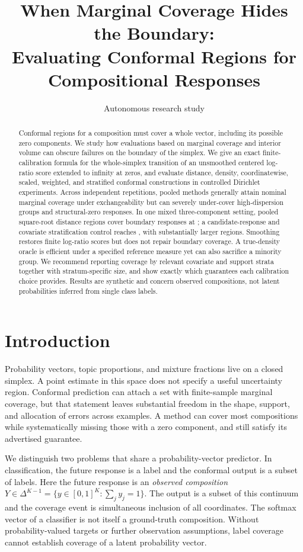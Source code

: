 \documentclass{article}
\title{When Marginal Coverage Hides the Boundary:\\Evaluating Conformal Regions for Compositional Responses}
\author{Autonomous research study}
\newcommand{\D}{\Delta^{K-1}}
\begin{document}
\maketitle

\begin{abstract}
Conformal regions for a composition must cover a whole vector, including its possible zero components. We study how evaluations based on marginal coverage and interior volume can obscure failures on the boundary of the simplex. We give an exact finite-calibration formula for the whole-simplex transition of an unsmoothed centered log-ratio score extended to infinity at zeros, and evaluate distance, density, coordinatewise, scaled, weighted, and stratified conformal constructions in controlled Dirichlet experiments. Across independent repetitions, pooled methods generally attain nominal marginal coverage under exchangeability but can severely under-cover high-dispersion groups and structural-zero responses. In one mixed three-component setting, pooled square-root distance regions cover boundary responses at \MixedHBoundary; a candidate-response and covariate stratification control reaches \MixedHGZBoundary, with substantially larger regions. Smoothing restores finite log-ratio scores but does not repair boundary coverage. A true-density oracle is efficient under a specified reference measure yet can also sacrifice a minority group. We recommend reporting coverage by relevant covariate and support strata together with stratum-specific size, and show exactly which guarantees each calibration choice provides. Results are synthetic and concern observed compositions, not latent probabilities inferred from single class labels.
\end{abstract}

\section{Introduction}
Probability vectors, topic proportions, and mixture fractions live on a closed simplex. A point estimate in this space does not specify a useful uncertainty region. Conformal prediction can attach a set with finite-sample marginal coverage, but that statement leaves substantial freedom in the shape, support, and allocation of errors across examples. A method can cover most compositions while systematically missing those with a zero component, and still satisfy its advertised guarantee.

We distinguish two problems that share a probability-vector predictor. In classification, the future response is a label and the conformal output is a subset of labels. Here the future response is an \emph{observed composition} $Y\in\D=\{y\in[0,1]^K:\sum_jy_j=1\}$. The output is a subset of this continuum and the coverage event is simultaneous inclusion of all coordinates. The softmax vector of a classifier is not itself a ground-truth composition. Without probability-valued targets or further observation assumptions, label coverage cannot establish coverage of a latent probability vector.
\end{document}
